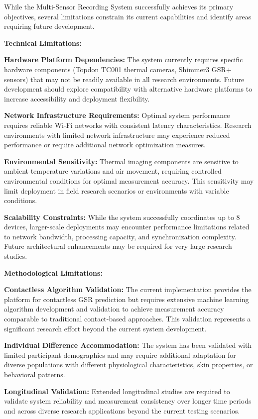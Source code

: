 \documentclass[12pt,a4paper]{report}
\begin{document}
While the Multi-Sensor Recording System successfully achieves its primary objectives, several limitations constrain its
current capabilities and identify areas requiring future development.

\textbf{Technical Limitations:}

\textbf{Hardware Platform Dependencies:}
The system currently requires specific hardware components (Topdon TC001 thermal cameras, Shimmer3 GSR+ sensors) that
may not be readily available in all research environments. Future development should explore compatibility with
alternative hardware platforms to increase accessibility and deployment flexibility.

\textbf{Network Infrastructure Requirements:}
Optimal system performance requires reliable Wi-Fi networks with consistent latency characteristics. Research
environments with limited network infrastructure may experience reduced performance or require additional network
optimization measures.

\textbf{Environmental Sensitivity:}
Thermal imaging components are sensitive to ambient temperature variations and air movement, requiring controlled
environmental conditions for optimal measurement accuracy. This sensitivity may limit deployment in field research
scenarios or environments with variable conditions.

\textbf{Scalability Constraints:}
While the system successfully coordinates up to 8 devices, larger-scale deployments may encounter performance
limitations related to network bandwidth, processing capacity, and synchronization complexity. Future architectural
enhancements may be required for very large research studies.

\textbf{Methodological Limitations:}

\textbf{Contactless Algorithm Validation:}
The current implementation provides the platform for contactless GSR prediction but requires extensive machine learning
algorithm development and validation to achieve measurement accuracy comparable to traditional contact-based approaches.
This validation represents a significant research effort beyond the current system development.

\textbf{Individual Difference Accommodation:}
The system has been validated with limited participant demographics and may require additional adaptation for diverse
populations with different physiological characteristics, skin properties, or behavioral patterns.

\textbf{Longitudinal Validation:}
Extended longitudinal studies are required to validate system reliability and measurement consistency over longer time
periods and across diverse research applications beyond the current testing scenarios.
\end{document}

